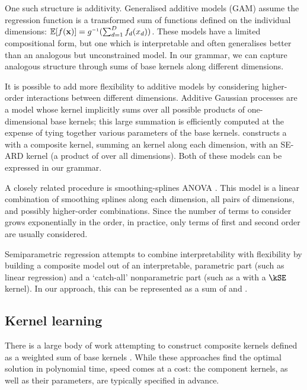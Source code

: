 One such structure is additivity.
Generalised additive models (GAM) assume the regression function is a transformed sum of functions defined on the individual dimensions: $\expect[f(\vx)] = g\inv(\sum_{d=1}^D f_d(x_d))$.
These models have a limited compositional form, but one which is interpretable and often generalises better than an analogous but unconstrained model.
In our grammar, we can capture analogous structure through sums of base kernels along different dimensions.

It is possible to add more flexibility to additive models by considering higher-order interactions between different dimensions. 
Additive Gaussian processes \citep{Duvenaud2011-wb} are a \gp{} model whose kernel implicitly sums over all possible products of one-dimensional base kernels; this large summation is efficiently computed at the expense of tying together various parameters of the base kernels.  
\citet{Plate1999-xh} constructs a \gp{} with a composite kernel, summing an \kSE{} kernel along each dimension, with an SE-ARD kernel (\ie a product of \kSE{} over all dimensions).
Both of these models can be expressed in our grammar.

A closely related procedure is smoothing-splines ANOVA \citep{Wahba1990-ml, Gu2002-at, Wahba2004-fk}.
This model is a linear combination of smoothing splines along each dimension, all pairs of dimensions, and possibly higher-order combinations.
Since the number of terms to consider grows exponentially in the order, in practice, only terms of first and second order are usually considered.

Semiparametric regression \citep[e.g.][]{Ruppert2003-uq} attempts to combine interpretability with flexibility by building  a composite model out of an interpretable, parametric part (such as linear regression) and a `catch-all' nonparametric part (such as a \gp{} with a $\kSE$ kernel).
In our approach, this can be represented as a sum of \kSE{} and \kLin{}.

\subsection{Kernel learning}
There is a large body of work attempting to construct composite kernels defined as a weighted sum of base kernels \citep[e.g.][]{Christoudias2009-an, Bach2009-hr}.
While these approaches find the optimal solution in polynomial time, speed comes at a cost: the component kernels, as well as their parameters, are typically specified in advance.

